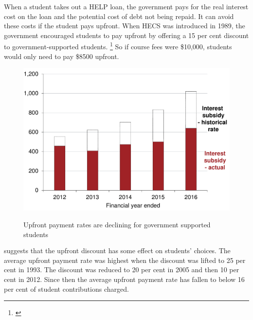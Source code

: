 \documentclass[embargoed]{grattan}
\begin{document}
When a student takes out a \gls{HELP} loan, the government pays for the real interest cost on the loan and the potential cost of debt not being repaid.
It can avoid these costs if the student pays upfront.
When \gls{HECS} was introduced in 1989, the government encouraged students to pay upfront by offering a 15 per cent discount to government-supported students.%
\footnote{\textcite[][79]{Wran1988ReportCommitteeHigher}} So if course fees were \$10,000, students would only need to pay \$8500 upfront.

\begin{figure}
\caption{Upfront payment rates are declining for government supported students}\label{fig:fig6-upfront-payment-rates-are-declining-for-govt-supported-students}

\includegraphics[page=6]{atlas/Chartpack.pdf}

{\textcites{EducationvariousyearsHighereducationreport}{Education2016StudentsSelectedhigher}}
\end{figure}

 suggests that the upfront discount has some effect on students' choices.
The average upfront payment rate was highest when the discount was lifted to 25 per cent in 1993.
The discount was reduced to 20 per cent in 2005 and then 10 per cent in 2012.
Since then the average upfront payment rate has fallen to below 16 per cent of student contributions charged.
\end{document}
